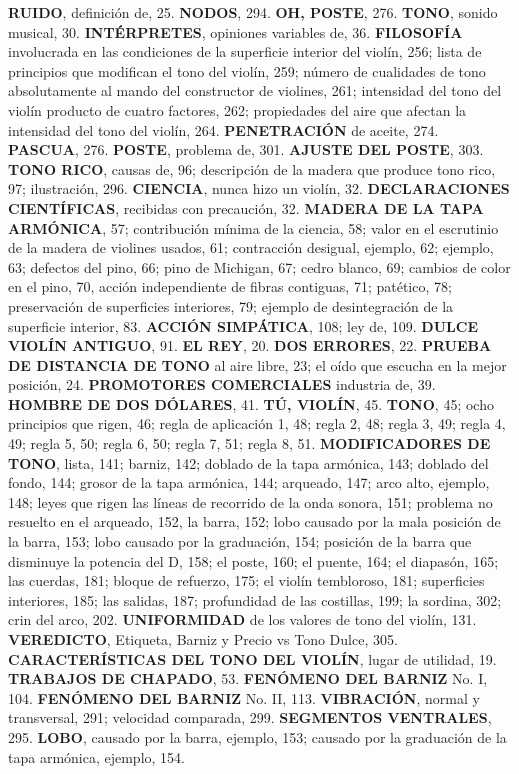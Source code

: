 \begin{multicols}{2}
\textbf{RUIDO}, definición de, 25.
\textbf{NODOS}, 294.
\textbf{OH, POSTE}, 276.
\textbf{TONO}, sonido musical, 30.
\textbf{INTÉRPRETES}, opiniones variables de, 36.
\textbf{FILOSOFÍA} involucrada en las condiciones de la superficie interior del violín, 256; lista de principios que modifican el tono del violín, 259; número de cualidades de tono absolutamente al mando del constructor de violines, 261; intensidad del tono del violín producto de cuatro factores, 262; propiedades del aire que afectan la intensidad del tono del violín, 264.
\textbf{PENETRACIÓN} de aceite, 274.
\textbf{PASCUA}, 276.
\textbf{POSTE}, problema de, 301.
\textbf{AJUSTE DEL POSTE}, 303.
\textbf{TONO RICO}, causas de, 96; descripción de la madera que produce tono rico, 97; ilustración, 296.
\textbf{CIENCIA}, nunca hizo un violín, 32.
\textbf{DECLARACIONES CIENTÍFICAS}, recibidas con precaución, 32.
\textbf{MADERA DE LA TAPA ARMÓNICA}, 57; contribución mínima de la ciencia, 58; valor en el escrutinio de la madera de violines usados, 61; contracción desigual, ejemplo, 62; ejemplo, 63; defectos del pino, 66; pino de Michigan, 67; cedro blanco, 69; cambios de color en el pino, 70, acción independiente de fibras contiguas, 71; patético, 78; preservación de superficies interiores, 79; ejemplo de desintegración de la superficie interior, 83.
\textbf{ACCIÓN SIMPÁTICA}, 108; ley de, 109.
\textbf{DULCE VIOLÍN ANTIGUO}, 91.
\textbf{EL REY}, 20.
\textbf{DOS ERRORES}, 22.
\textbf{PRUEBA DE DISTANCIA DE TONO} al aire libre, 23; el oído que escucha en la mejor posición, 24.
\textbf{PROMOTORES COMERCIALES} industria de, 39.
\textbf{HOMBRE DE DOS DÓLARES}, 41.
\textbf{TÚ, VIOLÍN}, 45.
\textbf{TONO}, 45; ocho principios que rigen, 46; regla de aplicación 1, 48; regla 2, 48; regla 3, 49; regla 4, 49; regla 5, 50; regla 6, 50; regla 7, 51; regla 8, 51.
\textbf{MODIFICADORES DE TONO}, lista, 141; barniz, 142; doblado de la tapa armónica, 143; doblado del fondo, 144; grosor de la tapa armónica, 144; arqueado, 147; arco alto, ejemplo, 148; leyes que rigen las líneas de recorrido de la onda sonora, 151; problema no resuelto en el arqueado, 152, la barra, 152; lobo causado por la mala posición de la barra, 153; lobo causado por la graduación, 154; posición de la barra que disminuye la potencia del D, 158; el poste, 160; el puente, 164; el diapasón, 165; las cuerdas, 181; bloque de refuerzo, 175; el violín tembloroso, 181; superficies interiores, 185; las salidas, 187; profundidad de las costillas, 199; la sordina, 302; crin del arco, 202.
\textbf{UNIFORMIDAD} de los valores de tono del violín, 131.
\textbf{VEREDICTO}, Etiqueta, Barniz y Precio vs Tono Dulce, 305.
\textbf{CARACTERÍSTICAS DEL TONO DEL VIOLÍN}, lugar de utilidad, 19.
\textbf{TRABAJOS DE CHAPADO}, 53.
\textbf{FENÓMENO DEL BARNIZ} No. I, 104.
\textbf{FENÓMENO DEL BARNIZ} No. II, 113.
\textbf{VIBRACIÓN}, normal y transversal, 291; velocidad comparada, 299.
\textbf{SEGMENTOS VENTRALES}, 295.
\textbf{LOBO}, causado por la barra, ejemplo, 153; causado por la graduación de la tapa armónica, ejemplo, 154.
\end{multicols}

